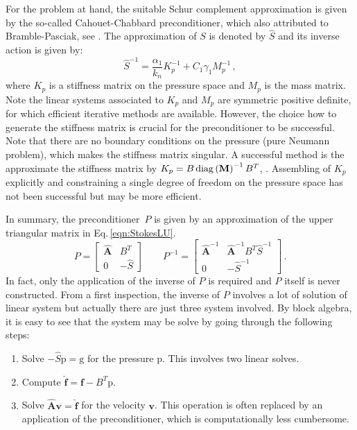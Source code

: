 For the problem at hand, the suitable Schur complement approximation is given by the so-called Cahouet-Chabbard preconditioner, which also attributed to Bramble-Pasciak, see \cite{Benzi2005,Bramble1997,Cahouet1988,Mardal2004}. The approximation of $S$ is denoted by $\hat{S}$ and its inverse action is given by:
\begin{equation}
	\hat{S}^{-1}=\frac{\alpha_1}{k_n}K_p^{-1}+C_1\gamma_1M_p^{-1}\,,
\end{equation}
where $K_p$ is a stiffness matrix on the pressure space and $M_p$ is the mass matrix. Note the linear systems associated to $K_p$ and $M_p$ are symmetric positive definite, for which efficient iterative methods are available. However, the choice how to generate the stiffness matrix is crucial for the preconditioner to be successful. Note that there are no boundary conditions on the pressure (pure Neumann problem), which makes the stiffness matrix singular. A successful method is the approximate the stiffness matrix by $K_p=B \operatorname{diag}\left(\mathbf{M}\right)^{-1} B^T$, \cf \cite{Cahouet1988}. Assembling of $K_p$ explicitly and constraining a single degree of freedom on the pressure space has not been successful but may be more efficient.

In summary, the preconditioner~$P$ is given by an approximation of the upper triangular matrix in Eq.\,\eqref{eqn:StokesLU}.
\begin{equation}
	P=\begin{bmatrix} \hat{\mathbf{A}} & B^T \\ 0 & -\hat{S}\end{bmatrix}\qquad
	P^{-1}=\begin{bmatrix} \hat{\mathbf{A}}^{-1} & \hat{\mathbf{A}}^{-1}B^T\hat{S}^{-1} \\ 0 & -\hat{S}^{-1}\end{bmatrix}\,.
\end{equation}
In fact, only the application of the inverse of $P$ is required and $P$ itself is never constructed. From a first inspection, the inverse of $P$ involves a lot of solution of linear system but actually there are just three system involved. By block algebra, it is easy to see that the system may be solve by going through the following steps:
\begin{enumerate}
	\item Solve $-\hat{S}\mathrm{p}=\mathrm{g}$ for the pressure $\mathrm{p}$. This involves two linear solves. 
	\item Compute $\hat{\mathbf{f}}=\mathbf{f}-B^T\mathrm{p}$.
	\item Solve $\hat{\mathbf{A}}\mathbf{v}=\hat{\mathbf{f}}$ for the velocity $\mathbf{v}$. This operation is often replaced by an application of the preconditioner, which is computationally less cumbersome.
\end{enumerate}

